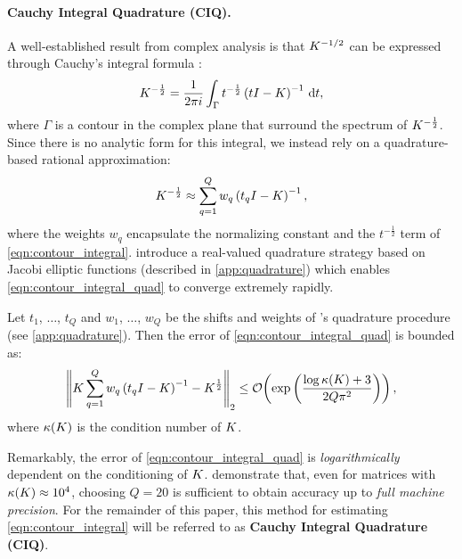 \paragraph{Cauchy Integral Quadrature (CIQ).}
A well-established result from complex analysis is that $K^{-1/2}$ can be expressed through Cauchy's integral formula \citep{davies2005computing,hale2008computing,golub2012matrix}:
%
\begin{equation}
	K^{-\frac 1 2} = \frac{1}{2 \pi i} \int_\Gamma t^{-\frac 1 2} \left( t I - K \right)^{-1} \,\mathrm{d}{t},
  \label{eqn:contour_integral}
\end{equation}
%
where $\Gamma$ is a contour in the complex plane that surround the spectrum of $K^{-\frac 1 2}$.
Since there is no analytic form for this integral, we instead rely on a quadrature-based rational approximation:
%
\begin{equation}
	K^{-\frac 1 2} \approx \sum_{q=1}^Q w_q \left( t_q I - K \right)^{-1},
	\label{eqn:contour_integral_quad}
\end{equation}
%
where the weights $w_q$ encapsulate the normalizing constant and the $t^{-\frac 1 2}$ term of \cref{eqn:contour_integral}.
\citet{hale2008computing} introduce a real-valued quadrature strategy based on Jacobi elliptic functions (described in \cref{app:quadrature}) which enables \cref{eqn:contour_integral_quad} to converge extremely rapidly.
%
\begin{lemma}
  Let $t_1$, $\ldots$, $t_Q$ and $w_1$, $\ldots$, $w_Q$ be the shifts and weights of \citet{hale2008computing}'s quadrature procedure (see \cref{app:quadrature}).
  Then the error of \cref{eqn:contour_integral_quad} is bounded as:
  \[
    \left\Vert \bK \sum_{q=1}^Q w_q \left( t_q \bI - \bK \right)^{-1} - \bK^{\frac 1 2} \right\Vert_2
    \leq \bigo{\exp\left( \frac {\log \kappa(\bK) + 3} {2 Q \pi^2} \right)},
  \]
  where $\kappa(K)$ is the condition number of $K$.
\label{lemma:hale}
\end{lemma}
%
\noindent
Remarkably, the error of \cref{eqn:contour_integral_quad} is \emph{logarithmically} dependent on the conditioning of $K$.
\citeauthor{hale2008computing} demonstrate that, even for matrices with $\kappa(K) \approx 10^4$, choosing $Q = 20$ is sufficient to obtain accuracy up to \emph{full machine precision}.
For the remainder of this paper, this method for estimating \cref{eqn:contour_integral} will be referred to as {\bf Cauchy Integral Quadrature (CIQ)}.

